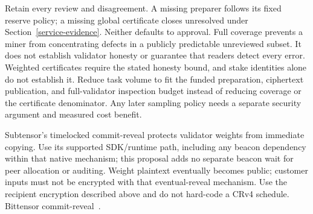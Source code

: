 Retain every review and disagreement. A missing preparer follows its fixed
reserve policy; a missing global certificate closes unresolved under
Section~\ref{service-evidence}. Neither defaults to approval. Full
coverage prevents a miner from concentrating defects in a publicly
predictable unreviewed subset. It does not establish validator honesty or
guarantee that readers detect every error. Weighted certificates require
the stated honesty bound, and stake identities alone do not establish it.
Reduce task volume to fit the funded preparation, ciphertext publication,
and full-validator inspection budget instead of reducing coverage or the
certificate denominator. Any later sampling
policy needs a separate security argument and measured cost benefit.

Subtensor's timelocked commit-reveal protects validator weights from
immediate copying. Use its supported SDK/runtime path, including any
beacon dependency within that native mechanism; this proposal adds no
separate beacon wait for peer allocation or auditing. Weight plaintext
eventually becomes public; customer inputs
must not be encrypted with that eventual-reveal mechanism. Use the
recipient encryption described above and do not hard-code a CRv4 schedule.
Bittensor commit-reveal~\cite{commitreveal}.
